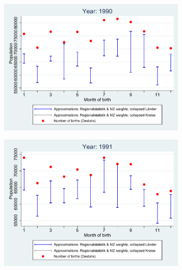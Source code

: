\documentclass[a4paper ]{article}
\begin{document}
\begin{figure}[h]
\centering
\caption{Reform 3: 1990 - 1995}
\begin{subfigure}[t]{0.48\textwidth}
		\centering
		\includegraphics[width=0.99\textwidth]{comparison_population_1990.pdf}		
\end{subfigure}
\begin{subfigure}[t]{0.48\textwidth}
		\centering
		\includegraphics[width=0.99\textwidth]{comparison_population_1991.pdf}		
\end{subfigure}
\begin{subfigure}[t]{0.48\textwidth}
		\centering

\end{subfigure}
\end{figure}
\end{document}
